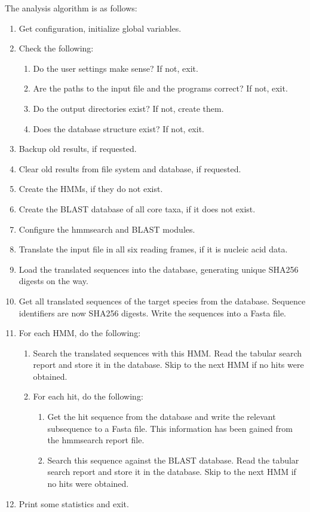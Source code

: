 
The analysis algorithm is as follows:

\begin{enumerate}
	\item Get configuration, initialize global variables.
	\item Check the following:
	\begin{enumerate}
		\item Do the user settings make sense? If not, exit.
		\item Are the paths to the input file and the programs correct? If not, exit.
		\item Do the output directories exist? If not, create them.
		\item Does the database structure exist? If not, exit.
	\end{enumerate}
	\item Backup old results, if requested.
	\item Clear old results from file system and database, if requested.
	\item Create the HMMs, if they do not exist.
	\item Create the BLAST database of all core taxa, if it does not exist.
	\item Configure the hmmsearch and BLAST modules.
	\item Translate the input file in all six reading frames, if it is nucleic acid data.
	\item Load the translated sequences into the database, generating unique SHA256
		digests on the way.
	\item Get all translated sequences of the target species from the database.
		Sequence identifiers are now SHA256 digests. Write the sequences into a
		Fasta file.
	\item For each HMM, do the following:
	\begin{enumerate}
		\item Search the translated sequences with this HMM. Read the tabular search
			report and store it in the database. Skip to the next HMM if no hits were
			obtained.
		\item For each hit, do the following:
		\begin{enumerate}
			\item Get the hit sequence from the database and write the relevant
				subsequence to a Fasta file. This information has been gained from the
				hmmsearch report file.
			\item Search this sequence against the BLAST database. Read the tabular
			search report and store it in the database. Skip to the next HMM if no
			hits were obtained.
		\end{enumerate}
	\end{enumerate}
	\item Print some statistics and exit.
\end{enumerate}

